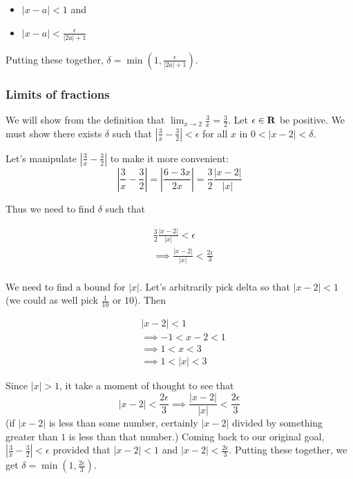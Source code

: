 \begin{itemize}
    \item $|x-a|<1$ and
    \item $|x-a|<\frac{\epsilon}{|2a|+1}$
\end{itemize}

Putting these together, $\delta=\min(1, \frac{\epsilon}{|2a|+1})$.

\subsubsection*{Limits of fractions}

We will show from the definition that
$\lim_{x\to 2}\frac{3}{x}=\frac{3}{2}$. Let $\epsilon\in\mathbf{R}$ be positive. We must
show there exists $\delta$ such that
$|\frac{3}{x}-\frac{3}{2}|<\epsilon$ for all $x$ in $0<|x-2|<\delta$.

\vs

Let's manipulate $|\frac{3}{x}-\frac{3}{2}|$ to make it more convenient:
\[\left|\frac{3}{x}-\frac{3}{2}\right|=\left|\frac{6-3x}{2x}\right|=\frac{3}{2}\frac{|x-2|}{|x|}\]

Thus we need to find $\delta$ such that

\begin{align*}
&\frac{3}{2}\frac{|x-2|}{|x|}<\epsilon\\
&\implies \frac{|x-2|}{|x|}<\frac{2\epsilon}{3}\\
\end{align*}

We need to find a bound for $|x|$. Let's arbitrarily pick delta so
that $|x-2|<1$ (we could as well pick $\frac{1}{10}$ or $10$). Then

\begin{align*}
    &|x-2|<1\\
    &\implies -1<x-2<1\\
    &\implies 1<x<3\\
    &\implies 1<|x|<3
\end{align*}

Since $|x|>1$, it take a moment of thought to see that
\[|x-2|<\frac{2\epsilon}{3}\implies\frac{|x-2|}{|x|}<\frac{2\epsilon}{3}\]
(if $|x-2|$ is less than some number, certainly $|x-2|$ divided by something greater than $1$ is less than that number.) Coming back to our original goal, $|\frac{3}{x}-\frac{3}{2}|<\epsilon$ provided that $|x-2|<1$ and $|x-2|<\frac{2\epsilon}{3}$. Putting these together, we get $\delta=\min(1, \frac{2\epsilon}{3})$.

